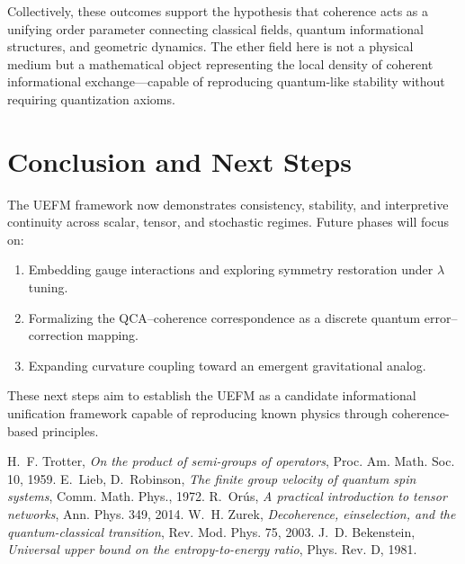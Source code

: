 \documentclass[11pt]{article}
\begin{document}
Collectively, these outcomes support the hypothesis that coherence acts as a unifying order parameter connecting classical fields, quantum informational structures, and geometric dynamics. The ether field here is not a physical medium but a mathematical object representing the local density of coherent informational exchange—capable of reproducing quantum-like stability without requiring quantization axioms.

\section{Conclusion and Next Steps}

The UEFM framework now demonstrates consistency, stability, and interpretive continuity across scalar, tensor, and stochastic regimes. Future phases will focus on:
\begin{enumerate}
  \item Embedding gauge interactions and exploring symmetry restoration under $\lambda$ tuning.
  \item Formalizing the QCA–coherence correspondence as a discrete quantum error–correction mapping.
  \item Expanding curvature coupling toward an emergent gravitational analog.
\end{enumerate}

These next steps aim to establish the UEFM as a candidate informational unification framework capable of reproducing known physics through coherence-based principles.


\begin{thebibliography}{99}
 H.~F. Trotter, \textit{On the product of semi-groups of operators}, Proc. Am. Math. Soc. 10, 1959.
 E.~Lieb, D.~Robinson, \textit{The finite group velocity of quantum spin systems}, Comm. Math. Phys., 1972.
 R.~Orús, \textit{A practical introduction to tensor networks}, Ann. Phys. 349, 2014.
 W.~H. Zurek, \textit{Decoherence, einselection, and the quantum-classical transition}, Rev. Mod. Phys. 75, 2003.
 J.~D. Bekenstein, \textit{Universal upper bound on the entropy-to-energy ratio}, Phys. Rev. D, 1981.
\end{thebibliography}
\end{document}
